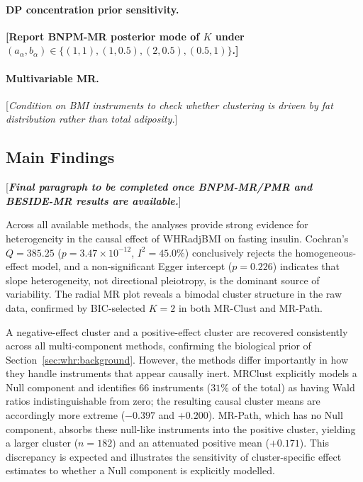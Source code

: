\documentclass[12pt,a4paper]{article}
\newcommand{\todo}[1]{\textcolor{notecol}{[\textit{#1}]}}
\newcommand{\placeholder}[1]{\textcolor{fcblue}{\textbf{[#1]}}}
\begin{document}
\paragraph{DP concentration prior sensitivity.}
\placeholder{Report BNPM-MR posterior mode of $K$ under
$(a_\alpha, b_\alpha) \in \{(1,1),(1,0.5),(2,0.5),(0.5,1)\}$.}

\paragraph{Multivariable MR.}
\todo{Condition on BMI instruments to check whether clustering is driven by
fat distribution rather than total adiposity.}

\subsection{Main Findings}
\label{sec:whr:findings}

\todo{\textbf{Final paragraph to be completed once BNPM-MR/PMR and
BESIDE-MR results are available.}}

Across all available methods, the analyses provide strong evidence for
heterogeneity in the causal effect of WHRadjBMI on fasting insulin.
Cochran's $Q = 385.25$ ($p = 3.47 \times 10^{-12}$, $I^{2} = 45.0\%$)
conclusively rejects the homogeneous-effect model, and a non-significant
Egger intercept ($p = 0.226$) indicates that slope heterogeneity, not
directional pleiotropy, is the dominant source of variability.  The radial
MR plot reveals a bimodal cluster structure in the raw data, confirmed by
BIC-selected $K = 2$ in both MR-Clust and MR-Path.

A negative-effect cluster and a positive-effect cluster are recovered
consistently across all multi-component methods, confirming the biological
prior of Section~\ref{sec:whr:background}.  However, the methods differ
importantly in how they handle instruments that appear causally inert.
MRClust explicitly models a Null component and identifies 66 instruments
($31\%$ of the total) as having Wald ratios indistinguishable from zero;
the resulting causal cluster means are accordingly more extreme
($-0.397$ and $+0.200$).  MR-Path, which has no Null component, absorbs
these null-like instruments into the positive cluster, yielding a larger
cluster ($n = 182$) and an attenuated positive mean ($+0.171$).  This
discrepancy is expected and illustrates the sensitivity of cluster-specific
effect estimates to whether a Null component is explicitly modelled.
\end{document}
